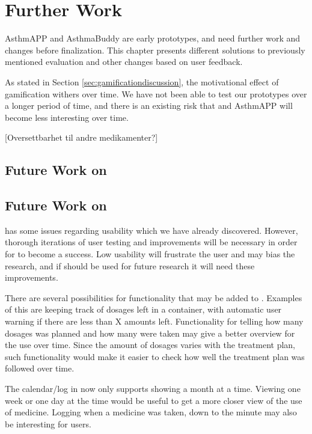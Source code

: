 \chapter{Further Work}
\label{chp:futurework}

AsthmAPP and AsthmaBuddy are early prototypes, and need further work and changes before finalization. This chapter presents different solutions to previously mentioned evaluation and other changes based on user feedback.

As stated in Section \ref{sec:gamificationdiscussion}, the motivational effect of gamification withers over time. We have not been able to test our prototypes over a longer period of time, and there is an existing risk that \buddy{} and AsthmAPP will become less interesting over time. 


[Oversettbarhet til andre medikamenter?]

\section{Future Work on \ab{}}

\section{Future Work on \app{}}
\label{sec:futureworkapp}
\app{} has some issues regarding usability which we have already discovered. However, thorough iterations of user testing and improvements will be necessary in order for \app{} to become a success. Low usability will frustrate the user and may bias the research, and if \app{} should be used for future research it will need these improvements. 

There are several possibilities for functionality that may be added to \app{}. Examples of this are keeping track of dosages left in a container, with automatic user warning if there are less than X amounts left. Functionality for telling how many dosages was planned and how many were taken may give a better overview for the use over time. Since the amount of dosages varies with the treatment plan, such functionality would make it easier to check how well the treatment plan was followed over time. 

The calendar/log in \app{} now only supports showing a month at a time. Viewing one week or one day at the time would be useful to get a more closer view of the use of medicine. Logging when a medicine was taken, down to the minute may also be interesting for users. 

